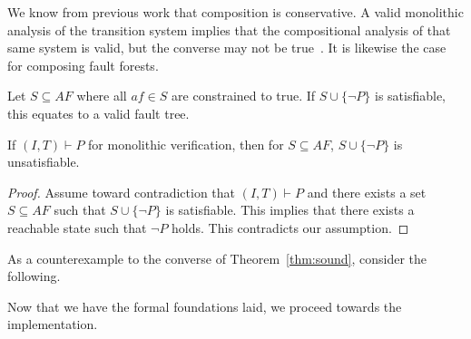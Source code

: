 We know from previous work that composition is conservative. A valid monolithic analysis of the transition system implies that the compositional analysis of that same system is valid, but the converse may not be true~\cite{}. It is likewise the case for composing fault forests. 

Let $S \subseteq \mathit{AF}$ where all $\mathit{af} \in S$ are constrained to true. If $S \cup \{\neg P\}$ is satisfiable, this equates to a valid fault tree. 

\begin{theorem} If $(I,T) \vdash P$ for monolithic verification, then for $S \subseteq \mathit{AF}$, $S \cup \{\neg P\}$ is unsatisfiable.
\begin{proof}
Assume toward contradiction that $(I,T) \vdash P$ and there exists a set $S \subseteq \mathit{AF}$ such that $S \cup \{\neg P\}$ is satisfiable. This implies that there exists a reachable state such that $\neg P$ holds. This contradicts our assumption. 
\end{proof}
\label{thm:sound}
\end{theorem}

As a counterexample to the converse of Theorem~\ref{thm:sound}, consider the following. 

Now that we have the formal foundations laid, we proceed towards the implementation. 





